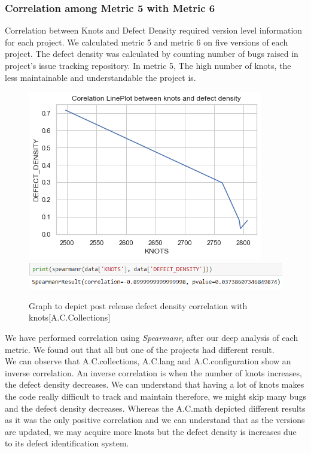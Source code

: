 \documentclass[letterpaper, 12 pt, conference]{ieeetran}  %
\begin{document}
\subsubsection{Correlation among Metric 5 with Metric 6 }
Correlation between Knots and Defect Density required version level information for each project. We calculated metric 5 and metric 6 on five versions of each project. The defect density was calculated by counting number of bugs raised in project's issue tracking repository. In metric 5, The high number of knots, the less maintainable and understandable the project is.
\begin{figure}[H]
    \centering
     \includegraphics[scale=0.60]{metric5 vs 6 commons-collections.png}%
   \\  \includegraphics[scale=0.55]{metric5 vs 6 commons-collections_spearmanr.png} %
    \caption{Graph to depict post release defect density correlation with knots{\footnotesize[A.C.Collections]}}
 \end{figure}
We have performed correlation using \textit{Spearmanr}, after our deep analysis of each metric. We found out that all but one of the projects had different result. \\We can observe that A.C.collections, A.C.lang and A.C.configuration show an inverse correlation. An inverse correlation is when the number of knots increases, the defect density decreases. We can understand that having a lot of knots makes the code really difficult to track and maintain therefore, we might skip many bugs and the defect density decreases. Whereas the A.C.math depicted different results as it was the only positive correlation and we can understand that as the versions are updated, we may acquire more knots but the defect density is increases due to its defect identification system.
\end{document}
